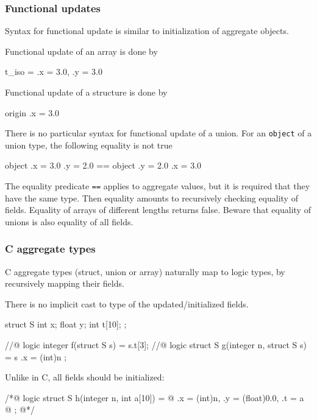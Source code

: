 \subsubsection{Functional updates}

Syntax for functional update is similar to initialization of aggregate objects.
\begin{example}
Functional update of an array is done by
\begin{listing-nonumber}
{ t_iso \with [0] = { .x = 3.0, .y = 3.0 } }
\end{listing-nonumber}

Functional update of a structure is done by
\begin{listing-nonumber}
{ origin \with .x = 3.0 }
\end{listing-nonumber}

There is no particular syntax for functional update of a union.
For an \lstinline|object| of a union type, the following equality is not true 
\begin{listing-nonumber}
{ { object \with .x = 3.0 }
           \with .y = 2.0 } == { { object \with .y = 2.0 }
                                          \with .x = 3.0 }
\end{listing-nonumber}

\end{example}

The equality predicate \lstinline|==| applies to aggregate values, but it
is required that they have the same type. Then equality amounts to
recursively checking equality of fields.  Equality of arrays of different
lengths returns false.  Beware that equality of unions is also
equality of all fields.


\subsubsection{C aggregate types}

C aggregate types (struct, union or array) naturally map to logic
types, by recursively mapping their fields.

\begin{example}
There is no implicit cast to type of the updated/initialized fields.
\begin{listing-nonumber}
struct S { int x; float y; int t[10]; };

//@ logic integer f(struct S s) = s.t[3];
//@ logic struct S g(integer n, struct S s) = { s \with .x = (int)n };
\end{listing-nonumber}
Unlike in C, all fields should be initialized:
\begin{listing-nonumber}
/*@ logic struct S h(integer n, int a[10]) = {
  @   .x = (int)n, .y = (float)0.0, .t = a
  @   };
  @*/
\end{listing-nonumber}
\end{example}

